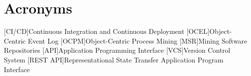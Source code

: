 \chapter*{Acronyms}
\begin{acronym}
[CI/CD]{Continuous Integration and Continuous Deployment}
[OCEL]{Object-Centric Event Log}
[OCPM]{Object-Centric Process Mining}
[MSR]{Mining Software Repositories}
[API]{Application Programming Interface}
[VCS]{Version Control System}
[REST API]{Representational State Transfer Application Program Interface}
\end{acronym}